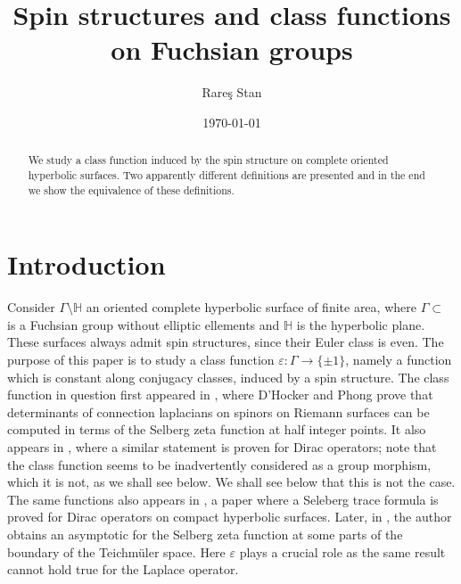 \documentclass[12pt]{amsart}
\theoremstyle{definition}
\def\HH{{\mathbb{H}}}
\def\G{{\Gamma}}
\DeclareMathOperator{\psl}{PSL_2(\mathbb{R})}
\begin{document}
\title[Spin structures and class functions on Fuchsian groups]{Spin structures and class functions on Fuchsian groups}
\author{Rare\c s Stan}
\address{Institute of Mathematics of the Romanian Academy\\ 
Bucharest\\ 
Romania}

\begin{abstract}
We study a class function induced by the spin structure on complete oriented hyperbolic surfaces. Two apparently different definitions are presented and in the end we show the equivalence of these definitions.
\end{abstract}

\date{\today}
\maketitle

\section{Introduction}
Consider $\G\setminus \HH$ an oriented complete hyperbolic surface of finite area, where $\G\subset \psl$ is a Fuchsian group without elliptic ellements and $\HH$ is the hyperbolic plane. These surfaces always admit spin structures, since their Euler class is even. The purpose of this paper is to study a class function $\varepsilon: \G \longrightarrow \{ \pm 1 \}$, namely a function which is constant along conjugacy classes, induced by a spin structure. The class function in question first appeared in \cite{dhockerPhong}, where D'Hocker and Phong prove that determinants of connection laplacians on spinors on Riemann surfaces can be computed in terms of the Selberg zeta function at half integer points. It also appears in \cite{SarnckDeterminantsOfLaplacians}, where a similar statement is proven for Dirac operators; note  that the class function seems to be inadvertently considered as a group morphism, which it is not, as we shall see below. We shall see below that this is not the case. The same functions also appears in \cite{BolteStiepanSelbergForDirac}, a paper where a Seleberg trace formula is proved for Dirac operators on compact hyperbolic surfaces. Later, in \cite{rares}, the author obtains an asymptotic for the Selberg zeta function at some parts of the boundary of the Teichm\" uler space. Here $\varepsilon$ plays a crucial role as the same result cannot hold true for the Laplace operator.
\end{document}

